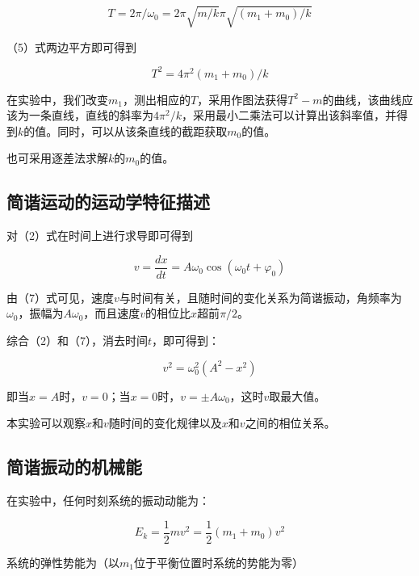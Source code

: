 \documentclass[11pt]{article}
\begin{document}
\begin{equation}
    T=2\pi/\omega_{0}=2\pi\sqrt{m/k}\pi\sqrt{(m_{1}+m_{0})/k}
\end{equation}

（5）式两边平方即可得到

\begin{equation}
    T^{2}=4\pi^{2}(m_{1}+m_{0})/k
\end{equation}

在实验中，我们改变$m_{1}$，测出相应的$T$，采用作图法获得$T^{2}-m$的曲线，该曲线应该为一条直线，直线的斜率为$4\pi^{2}/k$，采用最小二乘法可以计算出该斜率值，并得到$k$的值。同时，可以从该条直线的截距获取$m_{0}$的值。

也可采用逐差法求解$k$的$m_{0}$的值。

\subsection{简谐运动的运动学特征描述}

对（2）式在时间上进行求导即可得到

\begin{equation}
    v=\frac{dx}{dt}=A\omega_{0}\cos(\omega_{0}t+\varphi_{0})
\end{equation}

由（7）式可见，速度$v$与时间有关，且随时间的变化关系为简谐振动，角频率为$\omega_{0}$，振幅为$A\omega_{0}$，而且速度$v$的相位比$x$超前$\pi/2$。

综合（2）和（7），消去时间$t$，即可得到：

\begin{equation}
    v^{2}=\omega^{2}_{0}\left(A^{2}-x^{2}\right)
\end{equation}

即当$x=A$时，$v=0$；当$x=0$时，$v=\pm A\omega_{0}$，这时$v$取最大值。

本实验可以观察$x$和$v$随时间的变化规律以及$x$和$v$之间的相位关系。

\subsection{简谐振动的机械能}

在实验中，任何时刻系统的振动动能为：

\begin{equation}
    E_{k}=\frac{1}{2}mv^{2}=\frac{1}{2}\left(m_{1}+m_{0}\right)v^{2}
\end{equation}

系统的弹性势能为（以$m_{1}$位于平衡位置时系统的势能为零）
\end{document}
